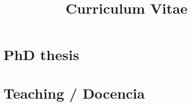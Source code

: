 \documentclass{article}
\begin{document}
\title{Curriculum Vitae}
\author{%
  \begin{tabular}{c}
      \\
    \url{http://www.researcherid.com/rid/} \\
    \url{https://orcid.org/} \\
    \url{https://scholar.google.es/citations?hl=es&user=
  \end{tabular}
}


\maketitle

\renewcommand{\refname}{Journal papers / Artículos en revistas}


\renewcommand{\refname}{Conference papers / Ponencias en congresos}


\renewcommand{\refname}{Books / Libros}


\renewcommand{\refname}{Book chapters / Capítulos de libro}


\renewcommand{\refname}{Projects / Proyectos}


\renewcommand{\refname}{Contracts / Contratos}


\renewcommand{\refname}{Phd thesis supervision / Supervisión de tesis}


\section*{PhD thesis}


\section*{Teaching / Docencia}


\renewcommand{\refname}{Courses / Cursos impartidos}


\renewcommand{\refname}{Final projects supervision / Supervisión de
  proyectos final de carrera}

\end{document}

